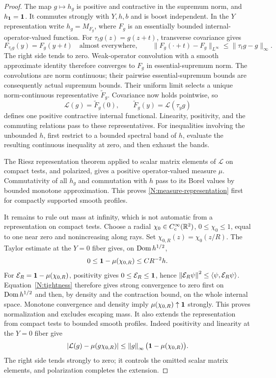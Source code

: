 \begin{proof}
The map $g\mapsto h_g$ is positive and contractive in the supremum
norm, and $h_{\mathbf1}=\mathbf 1$. It commutes strongly with $Y,h,b$ and is
boost independent. In the $Y$ representation write $h_g=M_{F_g}$,
where $F_g$ is an essentially bounded internal-operator-valued function.
For $\tau_tg(z)=g(z+t)$, transverse covariance gives
\[
 F_{\tau_tg}(y)=F_g(y+t)\quad\text{almost everywhere},\qquad
 \|F_g(\cdot+t)-F_g\|_{L^\infty}
 \le\|\tau_tg-g\|_\infty.
\]
The right side tends to zero. Weak-operator convolution with a smooth
approximate identity therefore converges to $F_g$ in essential-supremum
norm. The convolutions are norm continuous; their pairwise
essential-supremum bounds are consequently actual supremum bounds.
Their uniform limit selects a unique norm-continuous representative
$\widetilde F_g$. Covariance now holds pointwise, so
\[
 \mathcal L(g)=\widetilde F_g(0),\qquad
 \widetilde F_g(y)=\mathcal L(\tau_yg)
\]
defines one positive contractive internal functional. Linearity,
positivity, and the commuting relations pass to these representatives.
For inequalities involving the unbounded $h$, first restrict to a
bounded spectral band of $h$, evaluate the resulting continuous
inequality at zero, and then exhaust the bands.

The Riesz representation theorem applied to scalar matrix elements
of $\mathcal L$ on compact tests, and polarized, gives a positive
operator-valued measure $\mu$. Commutativity of all $h_g$ and
commutation with $h$ pass to its Borel values by bounded monotone
approximation. This proves \eqref{N:measure-representation} first for
compactly supported smooth profiles.

It remains to rule out mass at infinity, which is not automatic
from a representation on compact tests.  Choose a radial
$\chi_0\in C_c^\infty(\mathbb R^2)$, $0\leq\chi_0\leq1$, equal to one
near zero and nonincreasing along rays.  Set
$\chi_{0,R}(z)=\chi_0(z/R)$.  The Taylor estimate at the $Y=0$
fiber gives, on $\operatorname{Dom} h^{1/2}$,
\begin{equation}\label{N:tightness}
 0\leq\mathbf 1-\mu(\chi_{0,R})
 \leq C R^{-2}h.
\end{equation}
For $\mathcal E_R=\mathbf 1-\mu(\chi_{0,R})$, positivity gives
$0\leq \mathcal E_R\leq\mathbf 1$, hence
$\left\lVert\mathcal E_R\psi\right\rVert^2\leq\left\langle\psi,\mathcal E_R\psi\right\rangle$. Equation~\eqref{N:tightness}
therefore gives strong convergence to zero first on
$\operatorname{Dom} h^{1/2}$ and then, by density and the contraction bound,
on the whole internal space.
Monotone convergence and density imply
$\mu(\chi_{0,R})\uparrow\mathbf 1$ strongly.  This proves normalization
and excludes escaping mass.  It also extends the representation
from compact tests to bounded smooth profiles.  Indeed positivity
and linearity at the $Y=0$ fiber give
\[
 |\mathcal L(g)-\mu(g\chi_{0,R})|
 \leq\left\lVert g\right\rVert_\infty\bigl(\mathbf 1-\mu(\chi_{0,R})\bigr).
\]
The right side tends strongly to zero; it controls the omitted
scalar matrix elements, and polarization completes the extension.


\end{proof}
